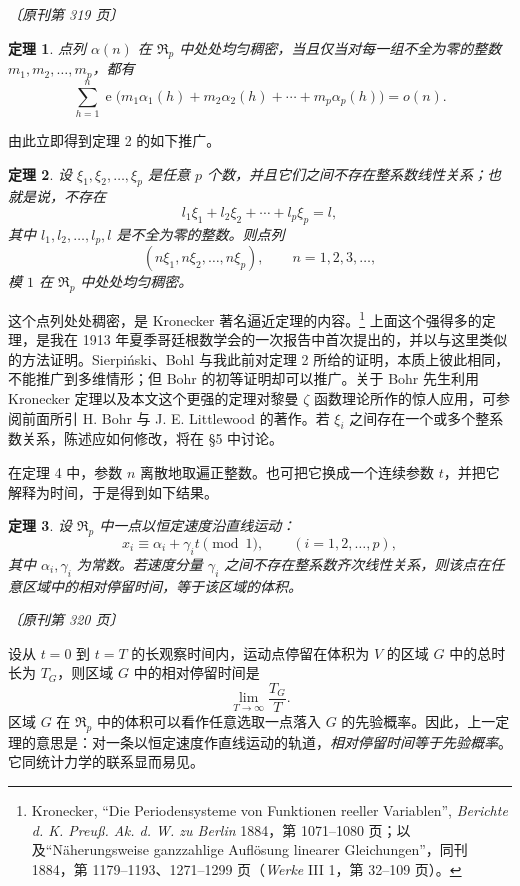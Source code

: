 \documentclass[UTF8,11pt,a4paper,fontset=none]{ctexart}
\theoremstyle{weylthm}
\newtheorem{theorem}{定理}
\newcommand{\e}{\operatorname{e}}
\newcommand{\origpage}[1]{%
  \par\vspace{0.7em}\noindent\hfill{\small\itshape〔原刊第 #1 页〕}\par\vspace{0.25em}}
\begin{document}
\origpage{319}

\begin{theorem}
点列 \(\alpha(n)\) 在 \(\mathfrak R_p\) 中处处均匀稠密，当且仅当对每一组不全为零的整数
\(m_1,m_2,\ldots,m_p\)，都有
\[
  \sum_{h=1}^{n}
  \e\bigl(m_1\alpha_1(h)+m_2\alpha_2(h)+\cdots+m_p\alpha_p(h)\bigr)
  =o(n).
\]
\end{theorem}

由此立即得到定理 2 的如下推广。

\begin{theorem}
设 \(\xi_1,\xi_2,\ldots,\xi_p\) 是任意 \(p\) 个数，并且它们之间不存在整系数线性关系；也就是说，不存在
\[
  l_1\xi_1+l_2\xi_2+\cdots+l_p\xi_p=l,
\]
其中 \(l_1,l_2,\ldots,l_p,l\) 是不全为零的整数。则点列
\[
  (n\xi_1,n\xi_2,\ldots,n\xi_p),
  \qquad n=1,2,3,\ldots,
\]
模 \(1\) 在 \(\mathfrak R_p\) 中处处均匀稠密。
\end{theorem}

这个点列处处稠密，是 Kronecker 著名逼近定理的内容。\footnote{Kronecker, “Die Periodensysteme von Funktionen reeller Variablen”, \textit{Berichte d. K. Preuß. Ak. d. W. zu Berlin} 1884，第 1071--1080 页；以及“Näherungsweise ganzzahlige Auflösung linearer Gleichungen”，同刊 1884，第 1179--1193、1271--1299 页（\textit{Werke} III 1，第 32--109 页）。} 上面这个强得多的定理，是我在 1913 年夏季哥廷根数学会的一次报告中首次提出的，并以与这里类似的方法证明。Sierpiński、Bohl 与我此前对定理 2 所给的证明，本质上彼此相同，不能推广到多维情形；但 Bohr 的初等证明却可以推广。关于 Bohr 先生利用 Kronecker 定理以及本文这个更强的定理对黎曼 \(\zeta\) 函数理论所作的惊人应用，可参阅前面所引 H. Bohr 与 J. E. Littlewood 的著作。若 \(\xi_i\) 之间存在一个或多个整系数关系，陈述应如何修改，将在 §5 中讨论。

在定理 4 中，参数 \(n\) 离散地取遍正整数。也可把它换成一个连续参数 \(t\)，并把它解释为时间，于是得到如下结果。

\begin{theorem}
设 \(\mathfrak R_p\) 中一点以恒定速度沿直线运动：
\begin{equation}
  x_i\equiv\alpha_i+\gamma_i t\pmod1,
  \qquad (i=1,2,\ldots,p),
  \tag{4}
\end{equation}
其中 \(\alpha_i,\gamma_i\) 为常数。若速度分量 \(\gamma_i\) 之间不存在整系数齐次线性关系，则该点在任意区域中的相对停留时间，等于该区域的体积。
\end{theorem}

\origpage{320}

设从 \(t=0\) 到 \(t=T\) 的长观察时间内，运动点停留在体积为 \(V\) 的区域 \(G\) 中的总时长为 \(T_G\)，则区域 \(G\) 中的相对停留时间是
\[
  \lim_{T\to\infty}\frac{T_G}{T}.
\]
区域 \(G\) 在 \(\mathfrak R_p\) 中的体积可以看作任意选取一点落入 \(G\) 的先验概率。因此，上一定理的意思是：对一条以恒定速度作直线运动的轨道，\emph{相对停留时间等于先验概率}。它同统计力学的联系显而易见。
\end{document}
